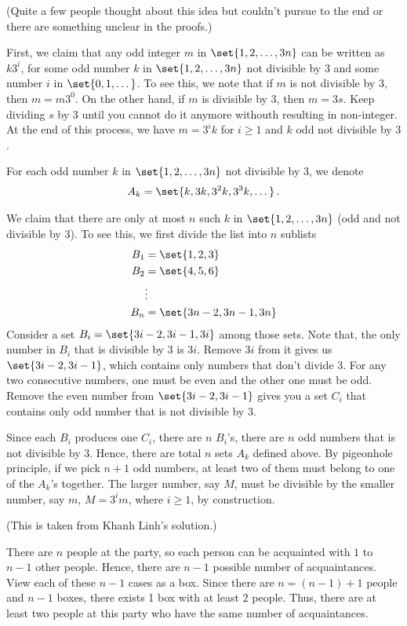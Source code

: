\documentclass[12pt]{amsart}
\begin{document}
\begin{problem}[Exercise 1.15]
(Quite a few people thought about this idea but couldn't pursue to the end or
there are something unclear in the proofs.)

First, we claim that any odd integer $m$ in $\set{1,2, \dots, 3n}$ can be written as $k 3^i$, for
some odd number $k$ in $\set{1,2, \dots, 3n}$ not divisible by $3$ and some number $i$ in $\set{0, 1, \dots}$.
To see this, we note that if $m$ is not divisible by $3$, then $m = m3^0 $.
On the other hand, if $m$ is divisible by $3$, then $ m = 3 s$. Keep dividing $s$ by $3$ until
you cannot do it anymore withouth resulting in non-integer.
At the end of this process, we have $m = 3^ik$ for $i\geq 1$ and $k$ odd not divisible by $3$.

For each odd number $k$ in $\set{1, 2, \dots, 3n}$ not divisible by $3$, we denote
\begin{align*}
	A_k = \set{k, 3k, 3^2 k, 3^3 k, \dots}\,.
\end{align*}

We claim that there are only at most $n$ such $k$ in $\set{1, 2, \dots, 3n}$ (odd and not divisible by $3$).
To see this, we first divide the list into $n$ sublists
\begin{align*}
	B_1 & = \set{ 1,2,3}         \\
	B_2 & = \set{4,5,6}          \\
	    & \vdots                 \\
	B_n & = \set{3n-2, 3n-1, 3n}
\end{align*}
Consider a set $B_i = \set{3i-2, 3i-1, 3i}$ among those sets.
Note that, the only number in $B_i$ that is divisible by $3$ is $3i$.
Remove $3i$ from it gives us $\set{3i-2, 3i-1}$, which contains only numbers
that don't divide $3$. For any two consecutive numbers, one must be even and the
other one must be odd. Remove the even number from $\set{3i-2 , 3i-1}$
gives you a set $C_i$ that contains only odd number that is not divisible by $3$.

Since each $B_i$ produces one $C_i$, there are $n$ $B_i$'s, there are $n$
odd numbers that is not divisible by $3$.
Hence, there are total $n$ sets $A_k$ defined above.
By pigeonhole principle, if we pick $n+1$ odd numbers,
at least two of them must belong to one of the $A_k$'s
together.
The larger number, say $M$, must be divisible by the smaller number, say $m$,
$M = 3^i m$, where $i\geq 1$, by construction.
\end{problem}

\begin{problem}[Exercise 1.20](This is taken from Khanh Linh's solution.)

There are $n$ people at the party, so each person can be acquainted with $1$ to $n - 1$
other people.
Hence, there are $n - 1$ possible number of acquaintances. View each of these $n - 1$
cases as a box.
Since there are $n = (n - 1) + 1$ people and $n - 1$ boxes,
there exists 1 box with
at least 2 people.
Thus, there are at least two people at this party who have the same number of
acquaintances.
\end{problem}



\printbibliography
%
%
\end{document}
